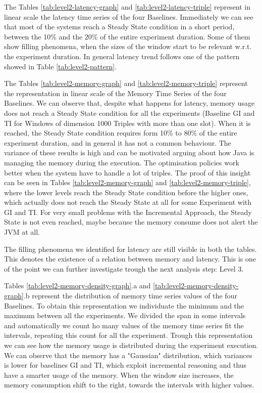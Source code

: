 The Tables \ref{tab:level2-latency-graph} and \ref{tab:level2-latency-triple} represent in linear scale the latency time series of the four Baselines. Immediately we can see that most of the systems reach a Steady State condition in a short period, between the 10\% and the 20\% of the entire experiment duration. Some of them show filling phenomena, when the sizes of the window start to be relevant w.r.t. the experiment duration. In general latency trend follows one of the pattern showed in Table \ref{tab:level2-pattern}. %

The Tables \ref{tab:level2-memory-graph} and \ref{tab:level2-memory-triple} represent the  representation in linear scale of the Memory Time Series of the four Baselines. We can observe that, despite what happens for latency, memory usage does not reach a Steady State condition for all the experiments (Baseline GI and TI for Windows of dimension 1000 Triples with more than one slot).  When it is reached, the Steady State condition requires form 10\% to 80\% of the entire experiment duration, and in general it has not a common behaviour. The variance of these results is high and can be motivated arguing about how Java is managing the memory during the execution. The optimisation policies work better when the system have to handle a lot of triples. The proof of this insight can be seen in Tables \ref{tab:level2-memory-graph} and \ref{tab:level2-memory-triple}, where the lower levels reach the Steady State condition before the higher ones, which actually does not reach the Steady State at all for some Experiment with GI and TI.  For very small problems with the Incremental Approach, the Steady State is not even reached, maybe because the memory consume does not alert the JVM at all. 


The filling phenomena we identified for latency are still visible in both the tables. This denotes the existence of a relation between memory and latency. This is one of the point we can further investigate trough the next analysis step: Level 3.

Tables \ref{tab:level2-memory-density-graph}.a and \ref{tab:level2-memory-density-graph}.b represent the distribution of memory time series values of the four Baselines. To obtain this representation we individuate the minimum and the maximum between all the experiments. We divided the span in some intervals and automatically we count ho many values of the memory time series fit the intervals, repeating this count for all the experiment. Trough this representation we can see how the memory usage is distributed during the experiment execution. We can observe that the memory has a "Gaussian" distribution, which variances is lower for baselines GI and TI, which exploit incremental reasoning and thus have a smarter usage of the memory. When the window size increases, the memory consumption shift to the right, towards the intervals with higher values.

